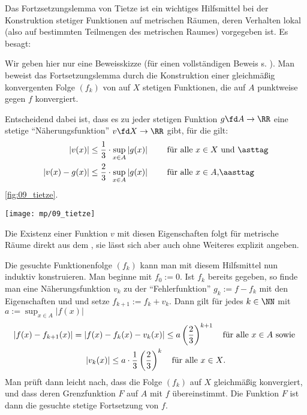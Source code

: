 \begin{antwort}
  Das Fortzsetzungslemma von Tietze ist ein wichtiges Hilfsmittel 
  bei der Konstruktion stetiger Funktionen auf metrischen Räumen, deren 
  Verhalten lokal (also auf bestimmten Teilmengen des metrischen 
  Raumes) vorgegeben ist. Es besagt:


  \medskip\noindent

  \medskip\noindent
  Wir geben hier nur eine Beweisskizze (für einen vollständigen 
  Beweis s. \citep{Koenig}). 
  Man beweist das Fortsetzungslemma durch die Konstruktion einer 
  gleichmäßig konvergenten Folge $(f_k)$ von auf $X$ 
  stetigen Funktionen, die auf $A$ punktweise gegen $f$ konvergiert. 

  Entscheidend dabei ist, dass es zu jeder stetigen 
  Funktion $g\fd A\to \RR$ eine stetige "`Näherungsfunktion"' 
  $v \fd X\to \RR$ gibt, für die gilt: 
  \begin{align}
    |v(x)|  &\le \frac{1}{3} \cdot \sup_{x\in A} |g(x)| 
    \qquad\text{ für alle $x\in X$ und } \asttag  \\
    |v(x)-g(x)| &\le \frac{2}{3} \cdot \sup_{x\in A} 
    |g(x)| \qquad \text{ für alle $x\in A$,} \aasttag 
  \end{align}
  \sieheAbbildung\ref{fig:09_tietze}.


  \begin{center}
    \texttt{[image: mp/09\_tietze]}
    \label{fig:09_tietze}
  \end{center}

  Die Existenz einer Funktion $v$ mit diesen Eigenschaften  
  folgt für metrische Räume direkt aus dem 
  , sie lässt sich aber 
  auch ohne Weiteres explizit angeben.  

  Die gesuchte Funktionenfolge $(f_k)$ kann man mit 
  diesem Hilfsmittel nun induktiv konstruieren. 
  Man beginne mit $f_0:=0$. Ist $f_k$ 
  bereits gegeben, so finde man eine Näherungsfunktion $v_k$ zu 
  der "`Fehlerfunktion"' $g_k := f-f_k$ 
  mit den Eigenschaften {\astref} und {\astastref} und setze 
  $f_{k+1}:= f_k + v_k$. Dann gilt für jedes $k\in\NN$ mit 
  $a:= \sup_{x\in A} |f(x)|$ 
  \begin{gather}
    | f(x)-f_{k+1}(x) | = | f(x)-f_{k}(x)- v_k (x) | \le 
    a \left( \frac{2}{3} \right)^{k+1} \quad\text{für alle $x\in A$ sowie } 
    \notag\\
    | v_k(x) | \le  a \cdot \frac{1}{3} \left( \frac{2}{3} \right)^k
    \quad\text{für alle $x\in X$.}\notag
  \end{gather}
  Man prüft dann leicht nach, dass die Folge $(f_k)$   
  auf $X$ gleichmäßig konvergiert, und dass 
  deren Grenzfunktion $F$ auf $A$ mit $f$ übereinstimmt.  
  Die Funktion $F$ ist dann die gesuchte stetige Fortsetzung von $f$.  
  \AntEnd  
\end{antwort}

